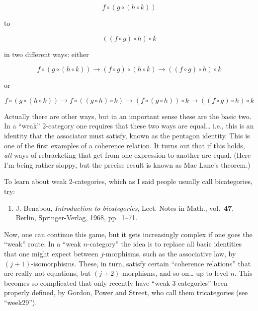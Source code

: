\documentclass{article}
\def\tightlist{}
\begin{document}
\[f \circ (g \circ (h \circ k))\]

to

\[((f \circ g) \circ h) \circ k\]

in two different ways: either

\[f \circ (g \circ (h \circ k)) \to (f \circ g) \circ (h \circ k) \to ((f \circ g) \circ h) \circ k\]

or

\[f \circ (g \circ (h \circ k)) \to f \circ ((g \circ h) \circ k) \to (f \circ (g \circ h)) \circ k \to ((f \circ g) \circ h) \circ k\]

Actually there are other ways, but in an important sense these are the
basic two. In a ``weak'' 2-category one requires that these two ways are
equal\ldots{} i.e., this is an identity that the associator must
satisfy, known as the pentagon identity. This is one of the first
examples of a coherence relation. It turns out that if this holds,
\emph{all} ways of rebracketing that get from one expression to another
are equal. (Here I'm being rather sloppy, but the precise result is
known as Mac Lane's theorem.)

To learn about weak 2-categories, which as I said people usually call
bicategories, try:

\begin{enumerate}
\def\labelenumi{\arabic{enumi})}
\setcounter{enumi}{1}
\tightlist
\item
  J. Benabou, \emph{Introduction to bicategories}, Lect. Notes in Math.,
  vol.~\textbf{47}, Berlin, Springer-Verlag, 1968, pp.~1--71.
\end{enumerate}

Now, one can continue this game, but it gets increasingly complex if one
goes the ``weak'' route. In a ``weak \(n\)-category'' the idea is to
replace all basic identities that one might expect between
\(j\)-morphisms, such as the associative law, by \((j+1)\)-isomorphisms.
These, in turn, satisfy certain ``coherence relations'' that are really
not equations, but \((j+2)\)-morphisms, and so on\ldots{} up to level
\(n\). This becomes so complicated that only recently have ``weak
3-categories'' been properly defined, by Gordon, Power and Street, who
call them tricategories (see ``week29'').
\end{document}
